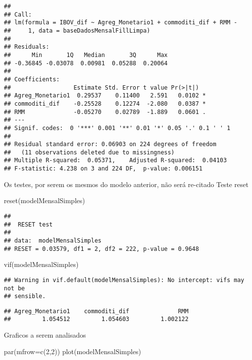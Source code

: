 \documentclass[
]{article}
\newenvironment{Shaded}{\begin{snugshade}}{\end{snugshade}}
\newcommand{\AttributeTok}[1]{\textcolor[rgb]{0.77,0.63,0.00}{#1}}
\newcommand{\DecValTok}[1]{\textcolor[rgb]{0.00,0.00,0.81}{#1}}
\newcommand{\FunctionTok}[1]{\textcolor[rgb]{0.00,0.00,0.00}{#1}}
\newcommand{\NormalTok}[1]{#1}
\begin{document}
\begin{verbatim}
## 
## Call:
## lm(formula = IBOV_dif ~ Agreg_Monetario1 + commoditi_dif + RMM - 
##     1, data = baseDadosMensalFillLimpa)
## 
## Residuals:
##      Min       1Q   Median       3Q      Max 
## -0.36845 -0.03078  0.00981  0.05288  0.20064 
## 
## Coefficients:
##                  Estimate Std. Error t value Pr(>|t|)  
## Agreg_Monetario1  0.29537    0.11400   2.591   0.0102 *
## commoditi_dif    -0.25528    0.12274  -2.080   0.0387 *
## RMM              -0.05270    0.02789  -1.889   0.0601 .
## ---
## Signif. codes:  0 '***' 0.001 '**' 0.01 '*' 0.05 '.' 0.1 ' ' 1
## 
## Residual standard error: 0.06903 on 224 degrees of freedom
##   (11 observations deleted due to missingness)
## Multiple R-squared:  0.05371,    Adjusted R-squared:  0.04103 
## F-statistic: 4.238 on 3 and 224 DF,  p-value: 0.006151
\end{verbatim}

Os testes, por serem os mesmos do modelo anterior, não será re-citado
Teste reset

\begin{Shaded}
\begin{Highlighting}[]
\FunctionTok{reset}\NormalTok{(modelMensalSimples)}
\end{Highlighting}
\end{Shaded}

\begin{verbatim}
## 
##  RESET test
## 
## data:  modelMensalSimples
## RESET = 0.03579, df1 = 2, df2 = 222, p-value = 0.9648
\end{verbatim}

\begin{Shaded}
\begin{Highlighting}[]
\FunctionTok{vif}\NormalTok{(modelMensalSimples)}
\end{Highlighting}
\end{Shaded}

\begin{verbatim}
## Warning in vif.default(modelMensalSimples): No intercept: vifs may not be
## sensible.
\end{verbatim}

\begin{verbatim}
## Agreg_Monetario1    commoditi_dif              RMM 
##         1.054512         1.054603         1.002122
\end{verbatim}

Graficos a serem analisados

\begin{Shaded}
\begin{Highlighting}[]
\FunctionTok{par}\NormalTok{(}\AttributeTok{mfrow=}\FunctionTok{c}\NormalTok{(}\DecValTok{2}\NormalTok{,}\DecValTok{2}\NormalTok{))}
\FunctionTok{plot}\NormalTok{(modelMensalSimples)}
\end{Highlighting}
\end{Shaded}
\end{document}
